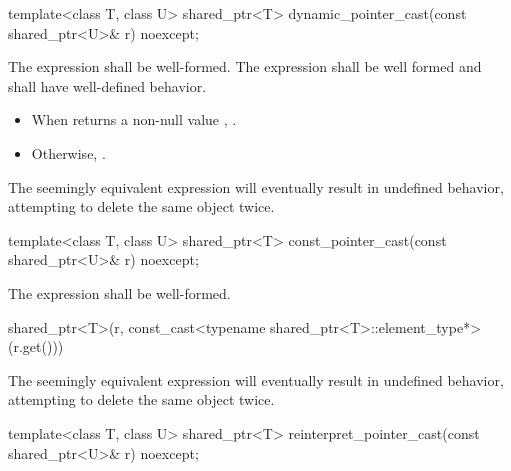 %
\begin{itemdecl}
template<class T, class U>
  shared_ptr<T> dynamic_pointer_cast(const shared_ptr<U>& r) noexcept;
\end{itemdecl}

\begin{itemdescr}
\pnum
\requires The expression 
shall be well-formed.
The expression 
shall be well formed and shall have well-defined behavior.

\pnum
\returns
\begin{itemize}
\item When 
returns a non-null value , .
\item Otherwise, .
\end{itemize}

\pnum
\begin{note}
The seemingly equivalent expression
 will eventually result in
undefined behavior, attempting to delete the same object twice.
\end{note}
\end{itemdescr}

%
\begin{itemdecl}
template<class T, class U>
  shared_ptr<T> const_pointer_cast(const shared_ptr<U>& r) noexcept;
\end{itemdecl}

\begin{itemdescr}
\pnum
\requires The expression  shall
be well-formed.

\pnum
\returns
\begin{codeblock}
shared_ptr<T>(r, const_cast<typename shared_ptr<T>::element_type*>(r.get()))
\end{codeblock}

\pnum
\begin{note}
The seemingly equivalent expression
 will eventually result in
undefined behavior, attempting to delete the same object twice.
\end{note}
\end{itemdescr}

%
\begin{itemdecl}
template<class T, class U>
  shared_ptr<T> reinterpret_pointer_cast(const shared_ptr<U>& r) noexcept;
\end{itemdecl}

